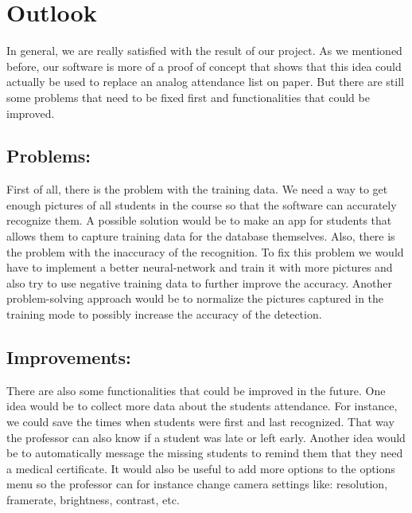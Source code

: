 \documentclass[12pt, a4paper]{article}
\begin{document}
\newpage



\section{Outlook}
In general, we are really satisfied with the result of our project. As we mentioned before, our software is more of a proof of concept that shows that this idea could actually be used to replace an analog attendance list on paper. But there are still some problems that need to be fixed first and functionalities that could be improved. 

\subsection{Problems:}
First of all, there is the problem with the training data. We need a way to get enough pictures of all students in the course so that the software can accurately recognize them. A possible solution would be to make an app for students that allows them to capture training data for the database themselves. Also, there is the problem with the inaccuracy of the recognition. To fix this problem we would have to implement a better neural-network and train it with more pictures and also try to use negative training data to further improve the accuracy. Another problem-solving approach would be to normalize the pictures captured in the training mode to possibly increase the accuracy of the detection. 

\subsection{Improvements:}
There are also some functionalities that could be improved in the future. One idea would be to collect more data about the students attendance. For instance, we could save the times when students were first and last recognized. That way the professor can also know if a student was late or left early. Another idea would be to automatically message the missing students to remind them that they need a medical certificate. It would also be useful to add more options to the options menu so the professor can for instance change camera settings like: resolution, framerate, brightness, contrast, etc. 
\end{document}
